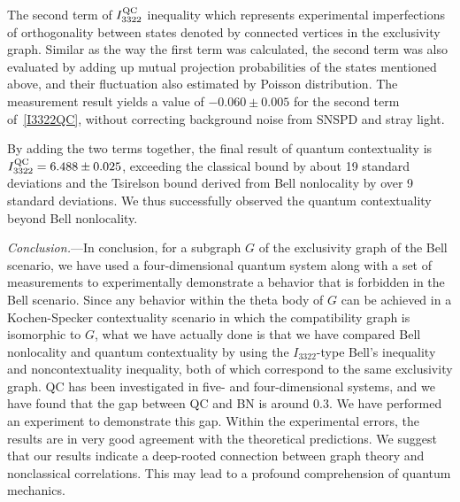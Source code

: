 \documentclass[prl,letterpaper,english,reprint,nofootinbib,aps,superscriptaddress,showpacs,showkeys]{revtex4-1}
\theoremstyle{definition}
\theoremstyle{remark}
\begin{document}
\fi

 The second term of $I_{3322}^{\rm QC}$ inequality which represents experimental imperfections of orthogonality between states denoted by connected vertices in the exclusivity graph.
 Similar as the way the first term was calculated, the second term was also evaluated by adding up mutual projection probabilities of the states mentioned above, and their fluctuation also estimated by Poisson distribution. The measurement result yields a value of $-0.060 \pm 0.005$ for the second term of~\ref{I3322QC}, without correcting background noise from SNSPD and stray light.

 By adding the two terms together, the final result of quantum contextuality is $I_{3322}^{\rm QC}=6.488 \pm 0.025$, exceeding the classical bound by about 19 standard deviations and the Tsirelson bound derived from Bell nonlocality by over 9 standard deviations. We thus successfully observed the quantum contextuality beyond Bell nonlocality.

 \emph{Conclusion.}---In conclusion, for a subgraph $G$ of the exclusivity graph of the Bell scenario, we have used a four-dimensional quantum system along with a set of measurements to experimentally demonstrate a behavior that is forbidden in the Bell scenario. Since any behavior within the theta body of $G$ can be achieved in a Kochen-Specker contextuality scenario in which the compatibility graph is isomorphic to $G$, what we have actually done is that we have compared Bell nonlocality and quantum contextuality by using the $I_{3322}$-type Bell's inequality and noncontextuality inequality, both of which correspond to the same exclusivity graph. QC has been investigated in  five- and four-dimensional systems, and we have found that the gap between QC and BN is around $0.3$. We have performed an experiment to demonstrate this gap. Within the experimental errors, the results are in very good agreement with the theoretical predictions.
We suggest that our results indicate a deep-rooted connection between graph theory and nonclassical correlations. This may lead to a profound comprehension of quantum mechanics.
\end{document}
